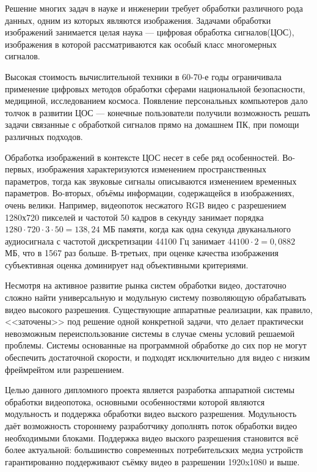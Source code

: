\label{sec:intro}

Решение многих задач в науке и инженерии требует обработки различного рода данных, одним из которых являются изображения.
Задачами обработки изображений занимается целая наука --- цифровая обработка сигналов(ЦОС),
изображения в которой рассматриваются как особый класс многомерных сигналов.

Высокая стоимость вычислительной техники в 60-70-е годы ограничивала применение
цифровых методов обработки сферами национальной безопасности, медициной, исследованием космоса.
Появление персональных компьютеров дало толчок в развитии ЦОС --- конечные пользователи
получили возможность решать задачи связанные с обработкой сигналов прямо на домашнем ПК,
при помощи различных подходов.

Обработка изображений в контексте ЦОС несет в себе ряд особенностей.
Во-первых, изображения характеризуются изменением пространственных параметров, тогда как звуковые сигналы описываются изменением временных параметров.
Во-вторых, объёмы информации, содержащейся в изображениях, очень велики.
Например, видеопоток несжатого RGB видео
с разрешением 1280х720 пикселей и частотой 50 кадров в секунду
занимает порядка $ 1280 \cdot 720 \cdot 3 \cdot 50 = 138,24 $ МБ памяти, когда как одна
секунда двуканального аудиосигнала с частотой дискретизации 44100 Гц
занимает $ 44100 \cdot 2 = 0,0882 $ МБ, что в 1567 раз больше. В-третьих, при оценке качества
изображения субъективная оценка доминирует над объективными критериями.

Несмотря на активное развитие рынка систем обработки видео, достаточно сложно найти
универсальную и модульную систему позволяющую обрабатывать видео высокого разрешения.
Существующие аппаратные реализации, как правило, <<заточены>> под решение одной конкретной задачи,
что делает практически невозможным переиспользование системы в случае смены условий решаемой проблемы.
Системы основанные на программной обработке до сих пор не могут обеспечить достаточной скорости, и подходят исключительно для видео с низким фреймрейтом или разрешением. %


Целью данного дипломного проекта является разработка аппаратной системы обработки
видеопотока, основными особенностями которой являются модульность и поддержка
обработки видео выского разрешения. Модульность даёт возможность стороннему
разработчику дополнять поток обработки видео необходимыми блоками.
Поддержка видео выского разрешения становится всё более актуальной:
большинство современных потребительских медиа устройств гарантированно
поддерживают съёмку видео в разрешении 1920x1080 и выше. %


